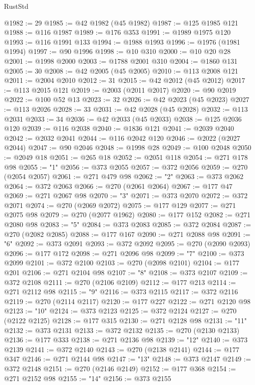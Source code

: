 \begin{lexlean}{RustStd}
\begin{coremodule}
@1982 := 29
@1985 := @42 @1982 (@45 @1982)
@1987 := @125 @1985 @121
@1988 := @116 @1987
@1989 := @176 @353
@1991 := @1989 @1975 @120
@1993 := @116 @1991 @133
@1994 := @1988 @1993
@1996 := @1976 (@1981 @1994)
@1997 := @90 @1996
@1998 := @10 @310
@2000 := @10 @20 @28
@2001 := @1998 @2000
@2003 := @1788 @2001 @310
@2004 := @1860 @131
@2005 := 30
@2008 := @42 @2005 (@45 @2005)
@2010 := @113 @2008 @121
@2011 := @2004 @2010
@2012 := 31
@2015 := @42 @2012 (@45 @2012)
@2017 := @113 @2015 @121
@2019 := @2003 (@2011 @2017)
@2020 := @90 @2019
@2022 := @100 @52 @13
@2023 := 32
@2026 := @42 @2023 (@45 @2023)
@2027 := @113 @2026
@2028 := 33
@2031 := @42 @2028 (@45 @2028)
@2032 := @113 @2031
@2033 := 34
@2036 := @42 @2033 (@45 @2033)
@2038 := @125 @2036 @120
@2039 := @116 @2038
@2040 := @1836 @121
@2041 := @2039 @2040
@2042 := @2032 @2041
@2044 := @116 @2042 @120
@2046 := @2022 (@2027 @2044)
@2047 := @90 @2046
@2048 := @1998 @28
@2049 := @100 @2048
@2050 := @2049 @18
@2051 := @265 @18
@2052 := @2051 @118
@2054 := @271 @178 @98
@2055 := "1"
@2056 := @373 @2055
@2057 := @372 @2056
@2059 := @270 (@2054 @2057)
@2061 := @271 @479 @98
@2062 := "2"
@2063 := @373 @2062
@2064 := @372 @2063
@2066 := @270 (@2061 @2064)
@2067 := @177 @47
@2069 := @271 @2067 @98
@2070 := "3"
@2071 := @373 @2070
@2072 := @372 @2071
@2074 := @270 (@2069 @2072)
@2075 := @177 @129
@2077 := @271 @2075 @98
@2079 := @270 (@2077 @1962)
@2080 := @177 @152
@2082 := @271 @2080 @98
@2083 := "5"
@2084 := @373 @2083
@2085 := @372 @2084
@2087 := @270 (@2082 @2085)
@2088 := @177 @167
@2090 := @271 @2088 @98
@2091 := "6"
@2092 := @373 @2091
@2093 := @372 @2092
@2095 := @270 (@2090 @2093)
@2096 := @177 @172
@2098 := @271 @2096 @98
@2099 := "7"
@2100 := @373 @2099
@2101 := @372 @2100
@2103 := @270 (@2098 @2101)
@2104 := @177 @201
@2106 := @271 @2104 @98
@2107 := "8"
@2108 := @373 @2107
@2109 := @372 @2108
@2111 := @270 (@2106 @2109)
@2112 := @177 @213
@2114 := @271 @2112 @98
@2115 := "9"
@2116 := @373 @2115
@2117 := @372 @2116
@2119 := @270 (@2114 @2117)
@2120 := @177 @227
@2122 := @271 @2120 @98
@2123 := "10"
@2124 := @373 @2123
@2125 := @372 @2124
@2127 := @270 (@2122 @2125)
@2128 := @177 @315
@2130 := @271 @2128 @98
@2131 := "11"
@2132 := @373 @2131
@2133 := @372 @2132
@2135 := @270 (@2130 @2133)
@2136 := @177 @333
@2138 := @271 @2136 @98
@2139 := "12"
@2140 := @373 @2139
@2141 := @372 @2140
@2143 := @270 (@2138 @2141)
@2144 := @177 @347
@2146 := @271 @2144 @98
@2147 := "13"
@2148 := @373 @2147
@2149 := @372 @2148
@2151 := @270 (@2146 @2149)
@2152 := @177 @368
@2154 := @271 @2152 @98
@2155 := "14"
@2156 := @373 @2155

\end{coremodule}
\end{lexlean}
